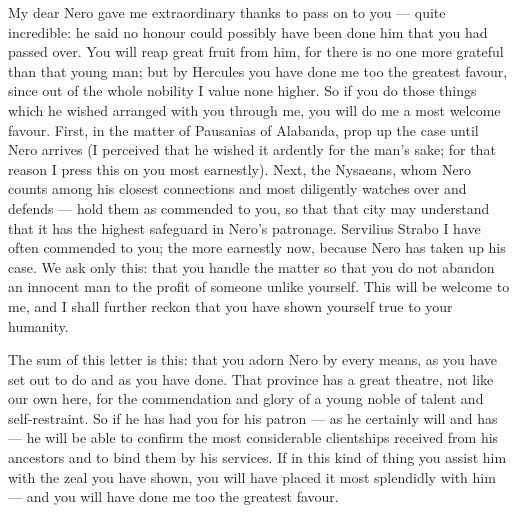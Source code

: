 

 My dear Nero gave me extraordinary thanks to pass on to you --- quite incredible: he said no honour could possibly have been done him that you had passed over. You will reap great fruit from him, for there is no one more grateful than that young man; but by Hercules you have done me too the greatest favour, since out of the whole nobility I value none higher. So if you do those things which he wished arranged with you through me, you will do me a most welcome favour. First, in the matter of Pausanias of Alabanda, prop up the case until Nero arrives (I perceived that he wished it ardently for the man's sake; for that reason I press this on you most earnestly). Next, the Nysaeans, whom Nero counts among his closest connections and most diligently watches over and defends --- hold them as commended to you, so that that city may understand that it has the highest safeguard in Nero's patronage. Servilius Strabo I have often commended to you; the more earnestly now, because Nero has taken up his case. We ask only this: that you handle the matter so that you do not abandon an innocent man to the profit of someone unlike yourself. This will be welcome to me, and I shall further reckon that you have shown yourself true to your humanity.

 The sum of this letter is this: that you adorn Nero by every means, as you have set out to do and as you have done. That province has a great theatre, not like our own here, for the commendation and glory of a young noble of talent and self-restraint. So if he has had you for his patron --- as he certainly will and has --- he will be able to confirm the most considerable clientships received from his ancestors and to bind them by his services. If in this kind of thing you assist him with the zeal you have shown, you will have placed it most splendidly with him --- and you will have done me too the greatest favour.
